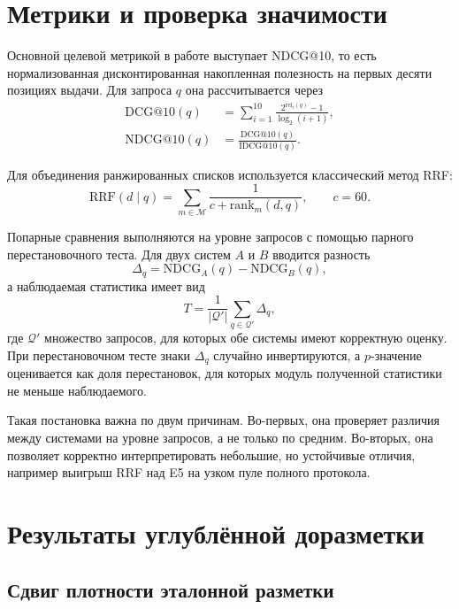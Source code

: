 \documentclass[runningheads,a4paper]{llncs}
\begin{document}
\section{Метрики и проверка значимости}

Основной целевой метрикой в работе выступает NDCG@10, то есть нормализованная дисконтированная накопленная полезность на первых десяти позициях выдачи. Для запроса $q$ она рассчитывается через
\begin{align}
\label{eq:dcg}
\mathrm{DCG}@10(q) &= \sum_{i=1}^{10} \frac{2^{\mathrm{rel}_i(q)} - 1}{\log_2(i + 1)}, \\
\label{eq:ndcg}
\mathrm{NDCG}@10(q) &= \frac{\mathrm{DCG}@10(q)}{\mathrm{IDCG}@10(q)}.
\end{align}

Для объединения ранжированных списков используется классический метод RRF:
\begin{equation}
\label{eq:rrf}
\mathrm{RRF}(d \mid q) = \sum_{m \in \mathcal{M}} \frac{1}{c + \mathrm{rank}_m(d,q)}, \qquad c = 60.
\end{equation}

Попарные сравнения выполняются на уровне запросов с помощью парного перестановочного теста. Для двух систем $A$ и $B$ вводится разность
\begin{equation}
\label{eq:delta}
\Delta_q = \mathrm{NDCG}_A(q) - \mathrm{NDCG}_B(q),
\end{equation}
а наблюдаемая статистика имеет вид
\begin{equation}
\label{eq:perm}
T = \frac{1}{|\mathcal{Q}'|} \sum_{q \in \mathcal{Q}'} \Delta_q,
\end{equation}
где $\mathcal{Q}'$ \textemdash{} множество запросов, для которых обе системы имеют корректную оценку. При перестановочном тесте знаки $\Delta_q$ случайно инвертируются, а $p$-значение оценивается как доля перестановок, для которых модуль полученной статистики не меньше наблюдаемого.

Такая постановка важна по двум причинам. Во-первых, она проверяет различия между системами на уровне запросов, а не только по средним. Во-вторых, она позволяет корректно интерпретировать небольшие, но устойчивые отличия, например выигрыш RRF над E5 на узком пуле полного протокола.

\section{Результаты углублённой доразметки}

\subsection{Сдвиг плотности эталонной разметки}
\end{document}

